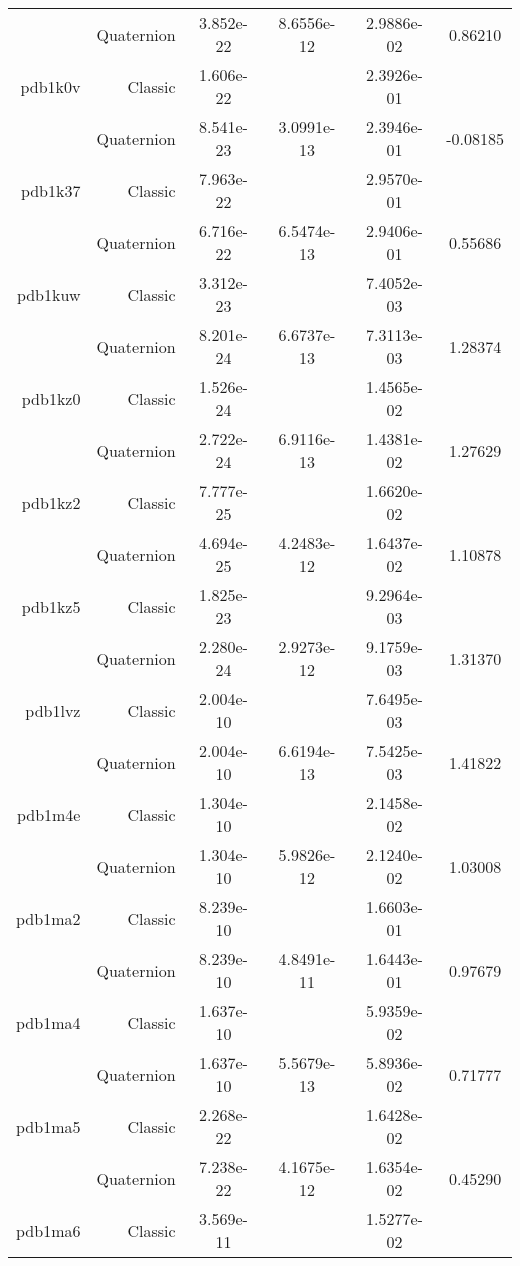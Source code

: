 \begin{xltabular}{\textwidth}{r|rS[table-format=1.3e+2]S[table-format=1.4e+2]S[table-format=1.4e+2]S[table-format=-1.5]}
& Quaternion & 3.852e-22 & 8.6556e-12 & 2.9886e-02 & 0.86210\\  \addlinespace
pdb1k0v & Classic & 1.606e-22 &  & 2.3926e-01 & \\
& Quaternion & 8.541e-23 & 3.0991e-13 & 2.3946e-01 & -0.08185\\  \addlinespace
pdb1k37 & Classic & 7.963e-22 &  & 2.9570e-01 & \\
& Quaternion & 6.716e-22 & 6.5474e-13 & 2.9406e-01 & 0.55686\\  \addlinespace
pdb1kuw & Classic & 3.312e-23 &  & 7.4052e-03 & \\
& Quaternion & 8.201e-24 & 6.6737e-13 & 7.3113e-03 & 1.28374\\  \addlinespace
pdb1kz0 & Classic & 1.526e-24 &  & 1.4565e-02 & \\
& Quaternion & 2.722e-24 & 6.9116e-13 & 1.4381e-02 & 1.27629\\  \addlinespace
pdb1kz2 & Classic & 7.777e-25 &  & 1.6620e-02 & \\
& Quaternion & 4.694e-25 & 4.2483e-12 & 1.6437e-02 & 1.10878\\  \addlinespace
pdb1kz5 & Classic & 1.825e-23 &  & 9.2964e-03 & \\
& Quaternion & 2.280e-24 & 2.9273e-12 & 9.1759e-03 & 1.31370\\  \addlinespace
pdb1lvz & Classic & 2.004e-10 &  & 7.6495e-03 & \\
& Quaternion & 2.004e-10 & 6.6194e-13 & 7.5425e-03 & 1.41822\\  \addlinespace
pdb1m4e & Classic & 1.304e-10 &  & 2.1458e-02 & \\
& Quaternion & 1.304e-10 & 5.9826e-12 & 2.1240e-02 & 1.03008\\  \addlinespace
pdb1ma2 & Classic & 8.239e-10 &  & 1.6603e-01 & \\
& Quaternion & 8.239e-10 & 4.8491e-11 & 1.6443e-01 & 0.97679\\  \addlinespace
pdb1ma4 & Classic & 1.637e-10 &  & 5.9359e-02 & \\
& Quaternion & 1.637e-10 & 5.5679e-13 & 5.8936e-02 & 0.71777\\  \addlinespace
pdb1ma5 & Classic & 2.268e-22 &  & 1.6428e-02 & \\
& Quaternion & 7.238e-22 & 4.1675e-12 & 1.6354e-02 & 0.45290\\  \addlinespace
pdb1ma6 & Classic & 3.569e-11 &  & 1.5277e-02 & \\

\end{xltabular}
